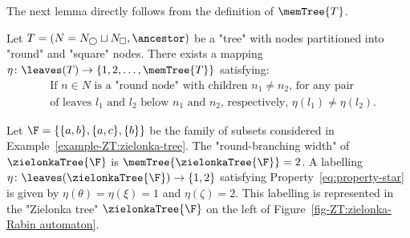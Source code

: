 \documentclass[10pt,a4paper]{amsart}
\renewcommand{\SS}{\Sigma}
\begin{document}
The next lemma directly follows from the definition of $\memTree{T}$.
\begin{lemma}\label{lemma:property_star}
	Let $T = (N = N_{\bigcirc} \sqcup N_\Box, \ancestor)$ be a "tree" with nodes partitioned into "round" and "square" nodes.
	There exists a mapping $\eta\colon \leaves(T) \to \{1,2,\dots, \memTree{T}\}$ satisfying:
	\begin{align}\label{eq:property-star}
		\nonumber&\text{If } n \in N \text{ is a "round node" with children } n_1 \neq n_2 \text{, for any pair}\\
		\tag{$\star$}&\text{of leaves } l_1 \text{ and } l_2 \text{ below } n_1 \text{ and } n_2 \text{, respectively, } \eta(l_1)\neq \eta(l_2).
	\end{align}
\end{lemma}



\begin{example}
	Let $\F=\{ \{a,b\}, \{a,c\}, \{b\}\}$ be the family of subsets considered in Example~\ref{example-ZT:zielonka-tree}. 
	The "round-branching width" of $\zielonkaTree{\F}$ is  $\memTree{\zielonkaTree{\F}} =2$. A labelling $\eta\colon \leaves(\zielonkaTree{\F}) \to \{1,2\}$ satisfying Property~\ref{eq:property-star} is given by $\eta(\theta) = \eta(\xi) = 1$ and $\eta(\zeta) = 2$.
	This labelling is represented in the "Zielonka tree" $\zielonkaTree{\F}$ on the left of Figure~\ref{fig-ZT:zielonka-Rabin automaton}.
\end{example}
\end{document}

